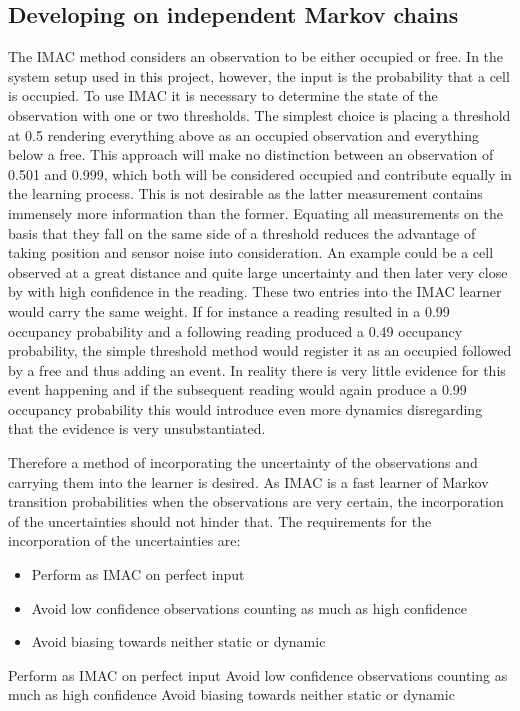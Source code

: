 \subsection{Developing on independent Markov chains}
The IMAC method considers an observation to be either occupied or free. In the system setup used in this project, however, the input is the probability that a cell is occupied. To use IMAC it is necessary to determine the state of the observation with one or two thresholds. The simplest choice is placing a threshold at 0.5 rendering everything above as an occupied observation and everything below a free. This approach will make no distinction between an observation of 0.501 and 0.999, which both will be considered occupied and contribute equally in the learning process. This is not desirable as the latter measurement contains immensely more information than the former. 
Equating all measurements on the basis that they fall on the same side of a threshold reduces the advantage of taking position and sensor noise into consideration. An example could be a cell observed at a great distance and quite large uncertainty and then later very close by with high confidence in the reading. These two entries into the IMAC learner would carry the same weight. If for instance a reading resulted in a 0.99 occupancy probability and a following reading produced a 0.49 occupancy probability, the simple threshold method would register it as an occupied followed by a free and thus adding an event. In reality there is very little evidence for this event happening and if the subsequent reading would again produce a 0.99 occupancy probability this would introduce even more dynamics disregarding that the evidence is very unsubstantiated. 

Therefore a method of incorporating the uncertainty of the observations and carrying them into the learner is desired. As IMAC is a fast learner of Markov transition probabilities when the observations are very certain, the incorporation of the uncertainties should not hinder that. 
The requirements for the incorporation of the uncertainties are:
\begin{itemize}
	\item Perform as IMAC on perfect input
	\item Avoid low confidence observations counting as much as high confidence
	\item Avoid biasing towards neither static or dynamic
\end{itemize}
Perform as IMAC on perfect input
Avoid low confidence observations counting as much as high confidence
Avoid biasing towards neither static or dynamic

